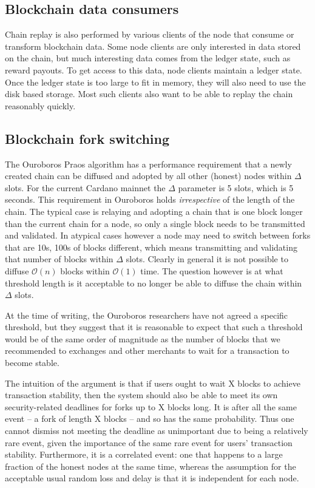 \documentclass[11pt,a4paper]{article}
\begin{document}
\subsection{Blockchain data consumers}

Chain replay is also performed by various clients of the node that consume
or transform blockchain data. Some node clients are only interested in data
stored on the chain, but much interesting data comes from the ledger state,
such as reward payouts. To get access to this data, node clients maintain a
ledger state. Once the ledger state is too large to fit in memory, they will
also need to use the disk based storage. Most such clients also want to be able
to replay the chain reasonably quickly.

\subsection{Blockchain fork switching}
\label{sec:blockchain-fork-switching}

The Ouroboros Praos algorithm has a performance requirement that a newly
created chain can be diffused and adopted by all other (honest) nodes within
$\Delta$ slots. For the current Cardano mainnet the $\Delta$ parameter is 5
slots, which is 5 seconds. This requirement in Ouroboros holds
\emph{irrespective} of the length of the chain. The typical case is relaying
and adopting a chain that is one block longer than the current chain for a node,
so only a single block needs to be transmitted and validated. In atypical cases
however a node may need to switch between forks that are 10s, 100s of blocks
different, which means transmitting and validating that number of blocks within
$\Delta$ slots. Clearly in general it is not possible to diffuse
$\mathcal{O}(n)$ blocks within $\mathcal{O}(1)$ time. The question however is
at what threshold length is it acceptable to no longer be able to diffuse the
chain within $\Delta$ slots.

At the time of writing, the Ouroboros researchers have not agreed a specific
threshold, but they suggest that it is reasonable to expect that such a
threshold would be of the same order of magnitude as the number of blocks that
we recommended to exchanges and other merchants to wait for a transaction to
become stable.

The intuition of the argument is that if users ought to wait X blocks to
achieve transaction stability, then the system should also be able to meet its
own security-related deadlines for forks up to X blocks long. It is after all
the same event -- a fork of length X blocks -- and so has the same probability.
Thus one cannot dismiss not meeting the deadline as unimportant due to being a
relatively rare event, given the importance of the same rare event for users'
transaction stability. Furthermore, it is a correlated event: one that happens
to a large fraction of the honest nodes at the same time, whereas the
assumption for the acceptable usual random loss and delay is that it is
independent for each node.
\end{document}
